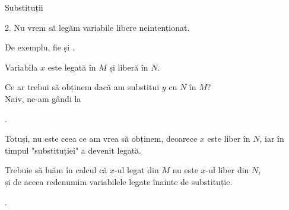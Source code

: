 \documentclass[xcolor=pdftex,romanian,colorlinks]{beamer}
\begin{document}
\begin{frame}[fragile]{Substituții}

\alert{2. Nu vrem să legăm variabile libere neintenționat.} 

De exemplu, fie  și .

Variabila $x$ este legată în $M$ și  liberă în $N$. 

Ce ar trebui să obținem dacă am substitui $y$ cu $N$ în $M$? \\ Naiv, ne-am gândi la

\vspace{-.2cm}
\begin{center}
.
\end{center}

\vspace{-.2cm}
Totuși, nu este ceea ce am vrea să obținem, deoarece $x$ este liber în $N$, iar în timpul "substituției" a devenit legată.

Trebuie să luăm în calcul că $x$-ul legat din $M$ nu este  $x$-ul liber din $N$, \\
și de aceea \alert{redenumim variabilele legate} înainte de substituție.

\vspace{-.2cm}
\begin{center}
.
\end{center}

\end{frame}

\end{document}
